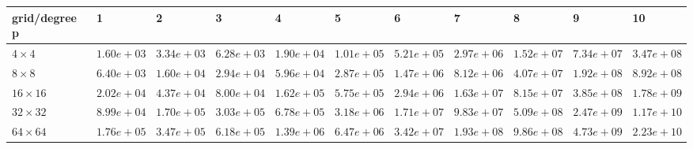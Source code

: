 \begin{tabular}{lllllllllll}
\hline
 grid/degree p   & 1          & 2          & 3          & 4          & 5          & 6          & 7          & 8          & 9          & 10         \\
\hline
 $4 \times 4$    & $1.60e+03$ & $3.34e+03$ & $6.28e+03$ & $1.90e+04$ & $1.01e+05$ & $5.21e+05$ & $2.97e+06$ & $1.52e+07$ & $7.34e+07$ & $3.47e+08$ \\
 $8 \times 8$    & $6.40e+03$ & $1.60e+04$ & $2.94e+04$ & $5.96e+04$ & $2.87e+05$ & $1.47e+06$ & $8.12e+06$ & $4.07e+07$ & $1.92e+08$ & $8.92e+08$ \\
 $16 \times 16$  & $2.02e+04$ & $4.37e+04$ & $8.00e+04$ & $1.62e+05$ & $5.75e+05$ & $2.94e+06$ & $1.63e+07$ & $8.15e+07$ & $3.85e+08$ & $1.78e+09$ \\
 $32 \times 32$  & $8.99e+04$ & $1.70e+05$ & $3.03e+05$ & $6.78e+05$ & $3.18e+06$ & $1.71e+07$ & $9.83e+07$ & $5.09e+08$ & $2.47e+09$ & $1.17e+10$ \\
 $64 \times 64$  & $1.76e+05$ & $3.47e+05$ & $6.18e+05$ & $1.39e+06$ & $6.47e+06$ & $3.42e+07$ & $1.93e+08$ & $9.86e+08$ & $4.73e+09$ & $2.23e+10$ \\
\hline
\end{tabular}